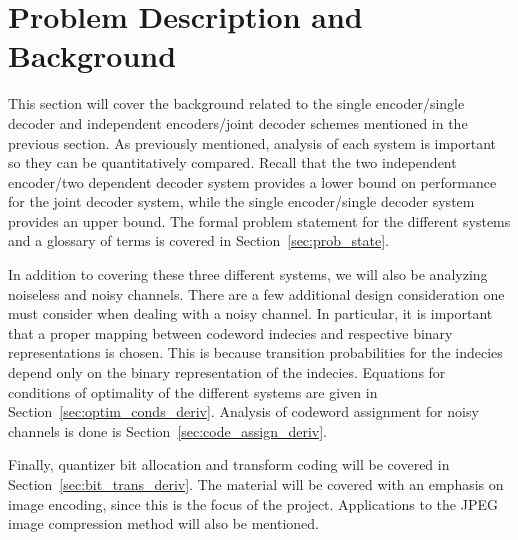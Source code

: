 \documentclass[10pt]{article}
\begin{document}
\section{Problem Description and Background}
This section will cover the background related to the single encoder/single decoder and independent encoders/joint decoder schemes mentioned in the previous section. As previously mentioned, analysis of each system is important so they can be quantitatively compared. Recall that the two independent encoder/two dependent decoder system provides a lower bound on performance for the joint decoder system, while the single encoder/single decoder system provides an upper bound. The formal problem statement for the different systems and a glossary of terms is covered in Section~\ref{sec:prob_state}.

In addition to covering these three different systems, we will also be analyzing noiseless and noisy channels. There are a few additional design consideration one must consider when dealing with a noisy channel. In particular, it is important that a proper mapping between codeword indecies and respective binary representations is chosen. This is because transition probabilities for the indecies depend only on the binary representation of the indecies. Equations for conditions of optimality of the different systems are given in Section~\ref{sec:optim_conds_deriv}. Analysis of codeword assignment for noisy channels is done is Section~\ref{sec:code_assign_deriv}.

Finally, quantizer bit allocation and transform coding will be covered in Section~\ref{sec:bit_trans_deriv}. The material will be covered with an emphasis on image encoding, since this is the focus of the project. Applications to the JPEG image compression method will also be mentioned.
\end{document}
